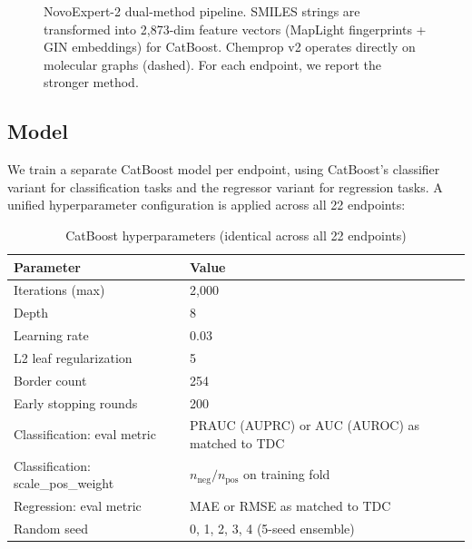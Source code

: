 \documentclass[11pt]{article}
\begin{document}
\begin{figure}[h]
{%
}
\caption{NovoExpert-2 dual-method pipeline. SMILES strings are transformed into 2{,}873-dim feature vectors (MapLight fingerprints + GIN embeddings) for CatBoost. Chemprop v2 operates directly on molecular graphs (dashed). For each endpoint, we report the stronger method.}
\label{fig:architecture}
\end{figure}

\subsection{Model}

We train a separate CatBoost model per endpoint, using CatBoost's classifier variant for classification tasks and the regressor variant for regression tasks. A unified hyperparameter configuration is applied across all 22 endpoints:

\begin{table}[h]
\centering
\caption{CatBoost hyperparameters (identical across all 22 endpoints)}
\label{tab:hyperparams}
\begin{tabular}{ll}
\toprule
Parameter & Value \\
\midrule
Iterations (max) & 2{,}000 \\
Depth & 8 \\
Learning rate & 0.03 \\
L2 leaf regularization & 5 \\
Border count & 254 \\
Early stopping rounds & 200 \\
Classification: eval metric & PRAUC (AUPRC) or AUC (AUROC) as matched to TDC \\
Classification: scale\_pos\_weight & $n_{\text{neg}} / n_{\text{pos}}$ on training fold \\
Regression: eval metric & MAE or RMSE as matched to TDC \\
Random seed & 0, 1, 2, 3, 4 (5-seed ensemble) \\
\bottomrule
\end{tabular}
\end{table}
\end{document}
